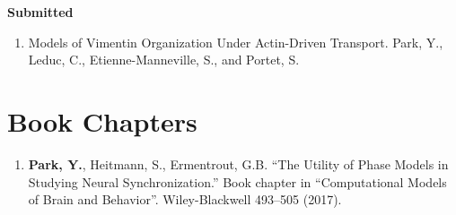 \documentclass[a4paper,10pt]{article}
\begin{document}
\textbf{Submitted}
\begin{enumerate}[leftmargin=.225in,rightmargin=.1in,itemsep=2pt]   
\item Models of Vimentin Organization Under Actin-Driven Transport. Park, Y., Leduc, C., Etienne-Manneville, S., and Portet, S.
\end{enumerate}


\section{Book Chapters}
\noindent
\renewcommand\labelitemi{\tiny$\bullet$}
\begin{enumerate}[leftmargin=.225in,rightmargin=.1in,itemsep=2pt]
    \item \textbf{Park, Y.}, Heitmann, S., Ermentrout, G.B. ``The Utility of Phase Models in Studying Neural Synchronization.'' Book chapter in ``Computational Models of Brain and Behavior''. Wiley-Blackwell 493--505 (2017).
\end{enumerate}
\end{document}
